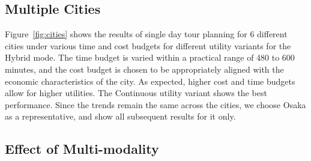 \subsection{Multiple Cities}

Figure~\ref{fig:cities} shows the results of single day tour planning for 6 different cities under various time and cost budgets for different utility variants for the Hybrid mode.
The time budget is varied within a practical range of 480 to 600 minutes, and the cost budget is chosen to be appropriately aligned with the economic characteristics of the city.
As expected, higher cost and time budgets allow for higher utilities.
The Continuous utility variant shows the best performance.
Since the trends remain the same across the cities, we choose Osaka as a representative, and show all subsequent results for it only.


\subsection{Effect of Multi-modality}

